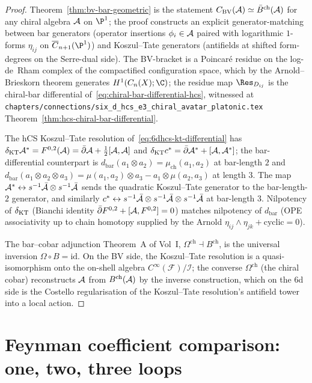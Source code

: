 \begin{proof}
Theorem~\ref{thm:bv-bar-geometric} is the statement
$C_{\mathrm{BV}}(\mathcal{A})\simeq \bar B^{\mathrm{ch}}(\mathcal{A})$ for any chiral algebra
$\mathcal{A}$ on $\P^1$; the proof constructs an explicit generator-matching
between bar generators (operator insertions $\phi_i\in\mathcal{A}$ paired
with logarithmic $1$-forms $\eta_{ij}$ on
$\overline C_{n+1}(\P^1)$) and Koszul--Tate generators (antifields at
shifted form-degrees on the Serre-dual side). The BV-bracket is a
Poincar\'e residue on the log-de~Rham complex of the compactified
configuration space, which by the Arnold--Brieskorn theorem generates
$H^1(C_n(X);\C)$; the residue map $\Res_{D_{ij}}$ is the chiral-bar
differential of~\eqref{eq:chiral-bar-differential-hcs}, witnessed at
\texttt{chapters/connections/six\_d\_hcs\_e3\_chiral\_avatar\_platonic.tex}
Theorem~\ref{thm:hcs-chiral-bar-differential}.

The hCS Koszul--Tate resolution of~\eqref{eq:6dhcs-kt-differential}
has $\delta_{\mathrm{KT}}\mathcal{A}^* = F^{0,2}(\mathcal{A}) = \bar\partial\mathcal{A} + \tfrac12[\mathcal{A},\mathcal{A}]$ and
$\delta_{\mathrm{KT}} c^* = \bar\partial\mathcal{A}^* + [\mathcal{A},\mathcal{A}^*]$; the bar-differential
counterpart is $d_{\mathrm{bar}}(a_1\otimes a_2) = \mu_{\mathrm{ch}}(a_1,a_2)$
at bar-length $2$ and
$d_{\mathrm{bar}}(a_1\otimes a_2\otimes a_3) = \mu(a_1,a_2)\otimes a_3
 - a_1\otimes\mu(a_2,a_3)$ at length $3$. The map
$\mathcal{A}^*\leftrightarrow s^{-1}\bar{\mathcal{A}}\otimes s^{-1}\bar{\mathcal{A}}$ sends the
quadratic Koszul--Tate generator to the bar-length-$2$ generator, and
similarly $c^*\leftrightarrow s^{-1}\bar{\mathcal{A}}\otimes s^{-1}\bar{\mathcal{A}}\otimes
s^{-1}\bar{\mathcal{A}}$ at bar-length $3$. Nilpotency of $\delta_{\mathrm{KT}}$
(Bianchi identity $\bar\partial F^{0,2} + [\mathcal{A},F^{0,2}] = 0$) matches
nilpotency of $d_{\mathrm{bar}}$ (OPE associativity up to chain
homotopy supplied by the Arnold $\eta_{ij}\wedge\eta_{jk} +
\mathrm{cyclic} = 0$).

The bar--cobar adjunction Theorem~A of Vol~I, $\Omega^{\mathrm{ch}}
\dashv B^{\mathrm{ch}}$, is the universal inversion $\Omega\circ B
= \mathrm{id}$. On the BV side, the Koszul--Tate resolution is a
quasi-isomorphism onto the on-shell algebra
$C^\infty(\mathcal F)/\mathcal I$; the converse $\Omega^{\mathrm{ch}}$
(the chiral cobar) reconstructs $\mathcal{A}$ from
$B^{\mathrm{ch}}(\mathcal{A})$ by the inverse construction, which on the 6d
side is the Costello regularisation of the
Koszul--Tate resolution's antifield tower into a local action.
\end{proof}

\section{Feynman coefficient comparison: one, two, three loops}
\label{sec:cfg-feynman-compare}


